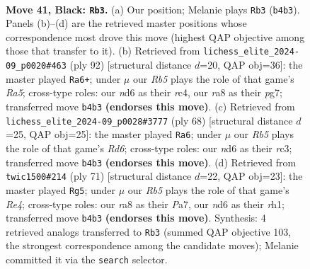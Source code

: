 \documentclass[11pt]{article}
\begin{document}
\clearpage

\begin{figure}[p]\centering
\begin{subfigure}{0.46\textwidth}\centering
\resizebox{\linewidth}{!}{%
\newchessgame
\chessboard[
  setfen={R7/6pk/3Npp2/1p5p/1r1P1P1P/4P1P1/6K1/8 b - - 3 41},
  showmover=false,
  pgfstyle=straightmove, color=movearrow, markmove={b4-b3}
]}
\caption{}
\end{subfigure}\hfill
\begin{subfigure}{0.46\textwidth}\centering
\resizebox{\linewidth}{!}{%
\newchessgame
\chessboard[
  setfen={8/6p1/3kp3/R4p1p/P1r1p3/4P1PP/3K1P2/8 w - - 0 47},
  showmover=false,
  pgfstyle=straightmove, color=movearrow, markmove={a5-a6}
]}
\caption{}
\end{subfigure}
\\[4pt]
\begin{subfigure}{0.46\textwidth}\centering
\resizebox{\linewidth}{!}{%
\newchessgame
\chessboard[
  setfen={5k2/5p2/3R2p1/p2P3p/P6P/2r3P1/5P2/6K1 w - - 0 35},
  showmover=false,
  pgfstyle=straightmove, color=movearrow, markmove={d6-a6}
]}
\caption{}
\end{subfigure}\hfill
\begin{subfigure}{0.46\textwidth}\centering
\resizebox{\linewidth}{!}{%
\newchessgame
\chessboard[
  setfen={8/ppp1kp2/8/P3r2p/1P5p/2PK1P2/6P1/7R b - - 1 36},
  showmover=false,
  pgfstyle=straightmove, color=movearrow, markmove={e5-g5}
]}
\caption{}
\end{subfigure}
\caption{\textbf{Move 41, Black: \texttt{Rb3}.} (a) Our position; Melanie plays \texttt{Rb3} (\texttt{b4b3}). Panels (b)--(d) are the retrieved master positions whose correspondence most drove this move (highest QAP objective among those that transfer to it). (b) Retrieved from \texttt{lichess\_elite\_2024-09\_p0020\#463} (ply 92) [structural distance $d$=20, QAP obj=36]: the master played \texttt{Ra6+}; under $\mu$ our \emph{Rb5} plays the role of that game's \emph{Ra5}; cross-type roles: our \emph{n}d6 as their \emph{r}c4, our \emph{r}a8 as their \emph{p}g7; transferred move \texttt{b4b3} \textbf{(endorses this move)}. (c) Retrieved from \texttt{lichess\_elite\_2024-09\_p0028\#3777} (ply 68) [structural distance $d$=25, QAP obj=25]: the master played \texttt{Ra6}; under $\mu$ our \emph{Rb5} plays the role of that game's \emph{Rd6}; cross-type roles: our \emph{n}d6 as their \emph{r}c3; transferred move \texttt{b4b3} \textbf{(endorses this move)}. (d) Retrieved from \texttt{twic1500\#214} (ply 71) [structural distance $d$=22, QAP obj=23]: the master played \texttt{Rg5}; under $\mu$ our \emph{Rb5} plays the role of that game's \emph{Re4}; cross-type roles: our \emph{r}a8 as their \emph{P}a7, our \emph{n}d6 as their \emph{r}h1; transferred move \texttt{b4b3} \textbf{(endorses this move)}. Synthesis: 4 retrieved analogs transferred to \texttt{Rb3} (summed QAP objective 103, the strongest correspondence among the candidate moves); Melanie committed it via the \texttt{search} selector.}
\label{fig:thought-m81}
\end{figure}
\end{document}

